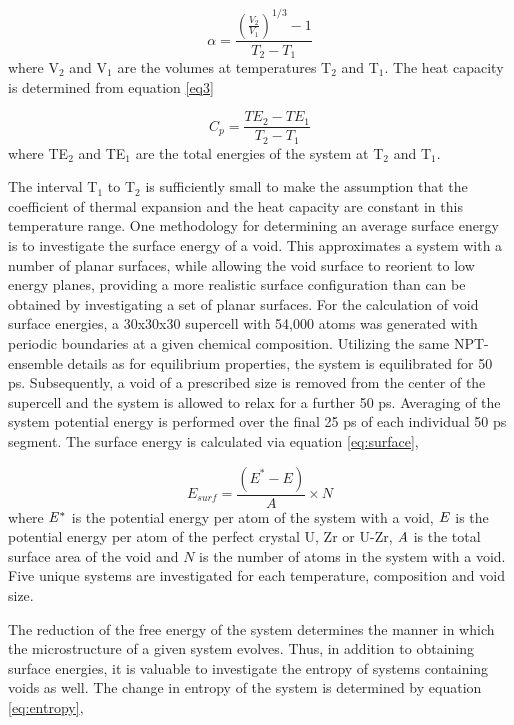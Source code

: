 \documentclass[review]{elsarticle}
\begin{document}
\begin{equation}
\label{eq2}
\alpha= \frac{(\frac{V_2}{V_1})^{1/3} - 1}{T_2-T_1}
\end{equation} where V$_2$ and V$_1$ are the volumes at temperatures T$_2$ and T$_1$. The heat capacity is determined from equation \ref{eq3}

\begin{equation}
\label{eq3}
C_p= \frac{TE_2 - TE_1}{T_2-T_1} 
\end{equation} where TE$_2$ and TE$_1$ are the total energies of the system at T$_2$ and T$_1$. 

The interval T$_1$ to T$_2$ is sufficiently small to make the assumption that the coefficient of thermal expansion and the heat capacity are constant in this temperature range. One methodology for determining an average surface energy is to investigate the surface energy of a void. This approximates a system with a number of planar surfaces, while allowing the void surface to reorient to low energy planes, providing a more realistic surface configuration than can be obtained by investigating a set of planar surfaces. For the calculation of void surface energies, a 30x30x30 supercell with 54,000 atoms was generated with periodic boundaries at a given chemical composition. Utilizing the same NPT-ensemble details as for equilibrium properties, the system is equilibrated for 50 ps. Subsequently, a void of a prescribed size is removed from the center of the supercell and the system is allowed to relax for a further 50 ps. Averaging of the system potential energy is performed over the final 25 ps of each individual 50 ps segment. The surface energy is calculated via equation \ref{eq:surface},

\begin{equation}
\label{eq:surface}
E_{surf}= \frac{(E^{*} - E)}{A} \times N
\end{equation} where $\it{E^{*}}$ is the potential energy per atom of the system with a void, $\it{E}$ is the potential energy per atom of the perfect crystal U, Zr or U-Zr, $\it{A}$ is the total surface area of the void and $\textit{N}$ is the number of atoms in the system with a void. Five unique systems are investigated for each temperature, composition and void size.

The reduction of the free energy of the system determines the manner in which the microstructure of a given system evolves. Thus, in addition to obtaining surface energies, it is valuable to investigate the entropy of systems containing voids as well. The change in entropy of the system is determined by equation \ref{eq:entropy},
\end{document}
